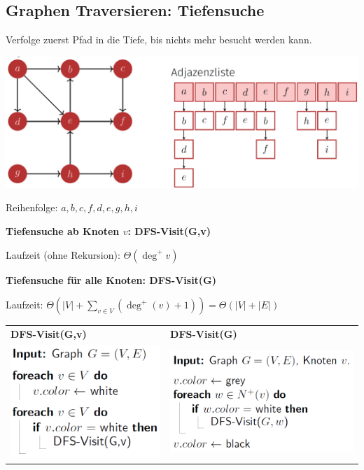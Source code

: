 \begin{sectionbox}
\subsection{Graphen Traversieren: Tiefensuche}\smallskip
Verfolge zuerst Pfad in die Tiefe, bis nichts mehr besucht werden kann.\par
\begin{center}
    \includegraphics[width = 0.9\columnwidth]{../img/DFS_sym.png}
\end{center}\par
Reihenfolge: $a, b, c, f, d, e, g, h, i$\medskip

\textbf{Tiefensuche ab Knoten $v$: DFS-Visit(G,v)}\par
Laufzeit (ohne Rekursion): $\Theta\left(\operatorname{deg}^{+} v\right)$\par\smallskip

\textbf{Tiefensuche für alle Knoten: DFS-Visit(G)}\par
Laufzeit: $\Theta(|V|+\sum_{v \in V}(\operatorname{deg}^{+}(v)+1))=\Theta(|V|+|E|)$\par\smallskip

\begin{tabular*}{\columnwidth}{@{\extracolsep\fill}ll@{}}
\textbf{DFS-Visit(G,v)} & \textbf{DFS-Visit(G)} \\
\includegraphics[width = 0.40\columnwidth]{../img/DFSG.png} &
\includegraphics[width = 0.54\columnwidth]{../img/DFSGv.png} \\
\end{tabular*}\smallskip
\end{sectionbox}

